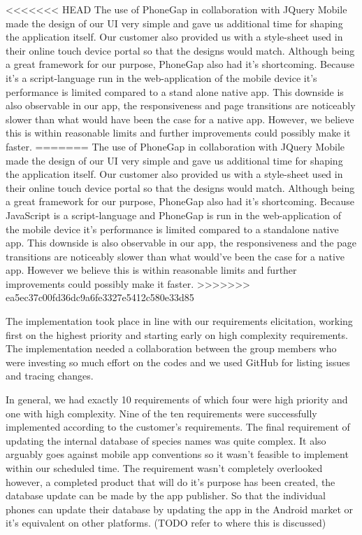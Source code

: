 <<<<<<< HEAD
The use of PhoneGap in collaboration with JQuery Mobile made the design of our UI very simple and gave us additional time for shaping the application itself.
Our customer also provided us with a style-sheet used in their online touch device portal so that the designs would match.
Although being a great framework for our purpose, PhoneGap also had it's shortcoming.
Because it's a script-language run in the web-application of the mobile device it's performance is limited compared to a stand alone native app.
This downside is also observable in our app, the responsiveness and page transitions are noticeably slower than what would have been the case for a native app.
However, we believe this is within reasonable limits and further improvements could possibly make it faster.
=======
The use of PhoneGap in collaboration with JQuery Mobile made the design of our
UI very simple and gave us additional time for shaping the application itself.
Our customer also provided us with a style-sheet used in their online touch
device portal so that the designs would match.  Although being a great framework
for our purpose, PhoneGap also had it's shortcoming.  Because JavaScript is a
script-language and PhoneGap is run in the web-application of the mobile device it's performance
is limited compared to a standalone native app.  This downside is also
observable in our app, the responsiveness and the page transitions are noticeably
slower than what would've been the case for a native app.  However we believe
this is within reasonable limits and further improvements could possibly make it
faster.
>>>>>>> ea5ec37c00fd36dc9a6fe3327e5412c580e33d85

The implementation took place in line with our requirements elicitation, working
first on the highest priority and starting early on high complexity
requirements.  The implementation needed a collaboration between the group
members who were investing so much effort on the codes and we used GitHub for
listing issues and tracing changes.

In general, we had exactly 10 requirements of which four were high priority and
one with high complexity.  Nine of the ten requirements were successfully
implemented according to the customer's requirements.  The final requirement of 
updating the internal database of species names was quite complex.
It also arguably goes against mobile app conventions so it wasn't feasible
to implement within our scheduled time. 
The requirement wasn't completely overlooked however, a completed product that will
do it's purpose has been created, the database update can be made by the app publisher.
So that the individual phones can update their database by updating the app in the 
Android market or it's equivalent on other platforms.
(TODO refer to where this is discussed)

